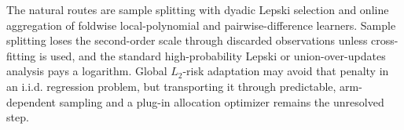 The natural routes are sample splitting with dyadic Lepski selection and online aggregation of foldwise local-polynomial and pairwise-difference learners.  Sample splitting loses the second-order scale through discarded observations unless cross-fitting is used, and the standard high-probability Lepski or union-over-updates analysis pays a logarithm.  Global \(L_2\)-risk adaptation may avoid that penalty in an i.i.d. regression problem, but transporting it through predictable, arm-dependent sampling and a plug-in allocation optimizer remains the unresolved step.